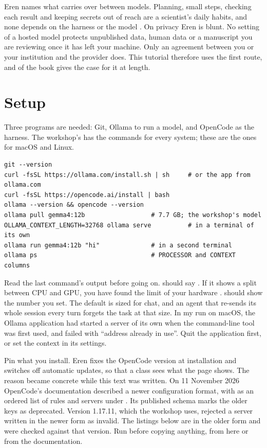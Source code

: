\documentclass[11pt,a4paper]{article}
\begin{document}
Eren names what carries over between models. Planning, small steps, checking
each result and keeping secrets out of reach are a scientist's daily habits,
and none depends on the harness or the model
\parencite{eren2026agenticcoding}. On privacy Eren is blunt. No setting of a
hosted model protects unpublished data, human data or a manuscript you are
reviewing once it has left your machine. Only an agreement between you or
your institution and the provider does. This tutorial therefore uses the
first route, and \bkLocal{} of the book gives the case for it at length.

\section{Setup}
\label{sec:setup}

Three programs are needed: Git, Ollama to run a model, and OpenCode as the
harness. The workshop's  has the commands for every system;
these are the ones for macOS and Linux.

\begin{lstlisting}[style=shell,caption={Install and check}]
git --version
curl -fsSL https://ollama.com/install.sh | sh     # or the app from ollama.com
curl -fsSL https://opencode.ai/install | bash
ollama --version && opencode --version
ollama pull gemma4:12b                  # 7.7 GB; the workshop's model
OLLAMA_CONTEXT_LENGTH=32768 ollama serve          # in a terminal of its own
ollama run gemma4:12b "hi"              # in a second terminal
ollama ps                               # PROCESSOR and CONTEXT columns
\end{lstlisting}

Read the last command's output before going on.  should say
. If it shows a split between CPU and GPU, you have found
the limit of your hardware \parencite{eren2026agenticcoding}.
 should show the number you
set. The default is sized for chat, and an agent that re-sends its whole
session every turn forgets the task at that size. In my run on macOS, the
Ollama application had started a server of its own when the command-line
tool was first used, and  failed with ``address already
in use''. Quit the application first, or set the context in its settings.

Pin what you install. Eren fixes the OpenCode version at installation and
switches off automatic updates, so that a class sees what the page shows.
The reason became concrete while this text was written. On 11 November 2026
OpenCode's documentation described a newer configuration format, with
 as an ordered list of rules and servers under
. Its published schema marks the older keys as deprecated.
Version 1.17.11, which the workshop uses, rejected a server written in the
newer form as invalid. The listings below are in the older form and were
checked against that version. Run  before copying
anything, from here or from the documentation.
\end{document}
